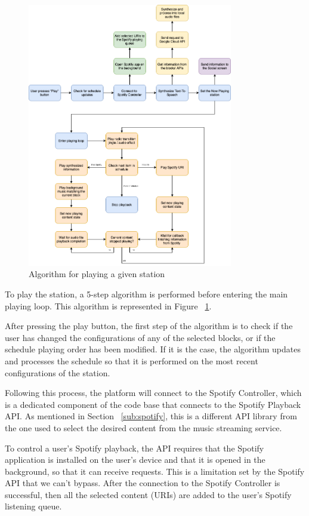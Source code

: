 \begin{figure}[h]
\centering
\includegraphics[width=0.8\textwidth]{./Images/code/alg.png}
\caption{Algorithm for playing a given station}
\label{fig:alg}
\end{figure}


To play the station, a 5-step algorithm is performed before entering the main playing loop. This algorithm is represented in Figure ~\ref{fig:alg}.

After pressing the play button, the first step of the algorithm is to check if the user has changed the configurations of any of the selected blocks, or if the schedule playing order has been modified. If it is the case, the algorithm updates and processes the schedule so that it is performed on the most recent configurations of the station.

Following this process, the platform will connect to the Spotify Controller, which is a dedicated component of the code base that connects to the Spotify Playback \ac{API}. As mentioned in Section ~\ref{sub:spotify}, this is a different \ac{API} library from the one used to select the desired content from the music streaming service.

To control a user's Spotify playback, the \ac{API} requires that the Spotify application is installed on the user's device and that it is opened in the background, so that it can receive requests. This is a limitation set by the Spotify \ac{API} that we can't bypass. After the connection to the Spotify Controller is successful, then all the selected content (\acp{URI}) are added to the user's Spotify listening queue.

